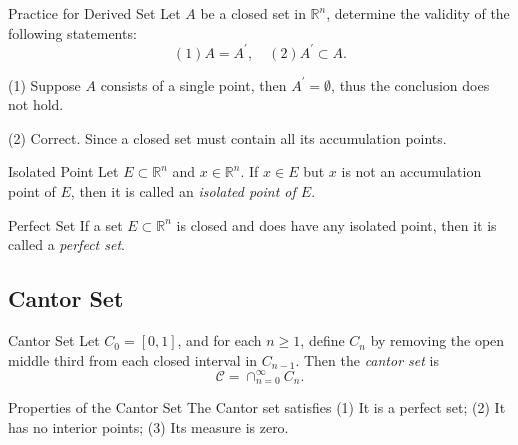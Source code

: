 \begin{example}{Practice for Derived Set}{}
  Let $A$ be a closed set in $\mathbb{R}^n$,
  determine the validity of the following statements:
  \begin{equation}
    (1) A = A^{\prime}, \quad
    (2) A^{\prime} \subset A.
  \end{equation}
\end{example}

\begin{solution}
  (1) Suppose $A$ consists of a single point,
  then $A^{\prime} = \emptyset$, thus the conclusion does not hold.

  (2) Correct. Since a closed set must contain all its accumulation points.
\end{solution}

\begin{definition}{Isolated Point}{}
  Let $E \subset \mathbb{R}^n$ and $x \in \mathbb{R}^n$.
  If $x \in E$ but $x$ is not an accumulation point of $E$,
  then it is called an \emph{isolated point of $E$}.
\end{definition}

\begin{definition}{Perfect Set}{}
  If a set $E \subset \mathbb{R}^n$ is closed and does have any isolated point,
  then it is called a \emph{perfect set}.
\end{definition}



\subsection{Cantor Set}

\begin{definition}{Cantor Set}{}
  Let $C_0 = [0, 1]$, and for each $n \geq 1$, define $C_n$ by removing the open
  middle third from each closed interval in $C_{n-1}$.
  Then the \emph{cantor set} is
  \begin{equation}
    \mathcal{C} = \cap _{n = 0}^{\infty}C_n.
  \end{equation}
\end{definition}

\begin{proposition}{Properties of the Cantor Set}{}
  The Cantor set satisfies
  (1) It is a perfect set;
  (2) It has no interior points;
  (3) Its measure is zero.
\end{proposition}


